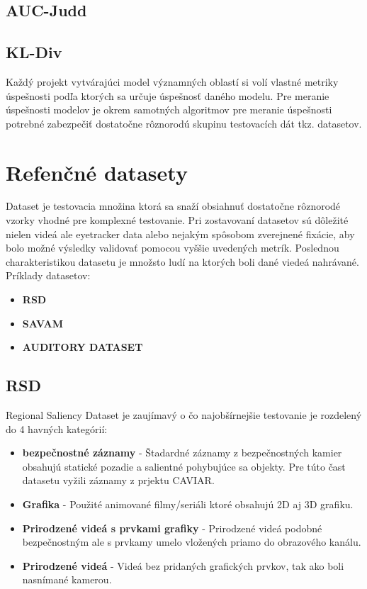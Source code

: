 \subsection{AUC-Judd}

\subsection{KL-Div}

Každý projekt vytvárajúci model významných oblastí si volí vlastné metriky úspešnosti podľa ktorých sa určuje úspešnosť daného modelu. Pre meranie úspešnosti modelov je okrem samotných algoritmov pre meranie úspešnosti potrebné zabezpečiť dostatočne rôznorodú skupinu testovacích dát tkz. datasetov.

\section{Refenčné datasety}
Dataset je testovacia množina ktorá sa snaží obsiahnuť dostatočne rôznorodé vzorky vhodné pre komplexné testovanie. Pri zostavovaní datasetov sú dôležité nielen videá ale eyetracker data alebo nejakým spôsobom zverejnené fixácie, aby bolo možné výsledky validovať pomocou vyššie uvedených metrík. Poslednou charakteristikou datasetu je množsto ludí na ktorých boli dané viedeá nahrávané. \\ Príklady datasetov:
\begin{itemize}
	\item \textbf{RSD}\cite{rsd}
	\item \textbf{SAVAM}\cite{savam}
	\item \textbf{AUDITORY DATASET}\cite{courot-dataset}
\end{itemize}

\subsection{RSD}
Regional Saliency Dataset je zaujímavý o čo najobšírnejšie testovanie je rozdelený do 4 havných kategórií: \\
\begin{itemize}
	\item \textbf{bezpečnostné záznamy} - Štadardné záznamy z bezpečnostných kamier obsahujú statické pozadie a salientné pohybujúce sa objekty. Pre túto čast datasetu vyžili záznamy z prjektu CAVIAR\cite{rsd-caviar}.
	\item \textbf{Grafika} - Použité animované filmy/seriáli ktoré obsahujú 2D aj 3D grafiku.
  \item \textbf{Prirodzené videá s prvkami grafiky} - Prirodzené videá  podobné bezpečnostným ale s prvkamy umelo vložených priamo do obrazového kanálu.
  \item \textbf{Prirodzené videá} - Videá bez pridaných grafických prvkov, tak ako boli nasnímané kamerou.
\end{itemize}

